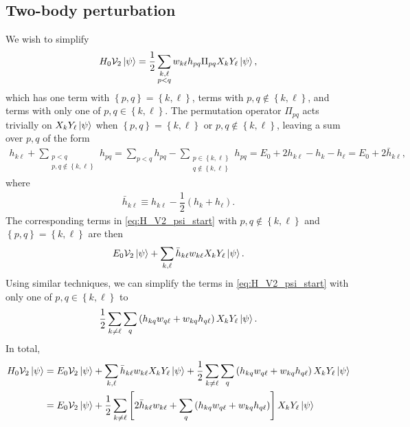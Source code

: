 \documentclass[nofootinbib,notitlepage,11pt]{revtex4-2}
\newcommand{\f}[2]{\dfrac{#1}{#2}} %
\newcommand{\p}[1]{\left(#1\right)} %
\renewcommand{\sp}[1]{\left[#1\right]} %
\renewcommand{\set}[1]{\left\{#1\right\}} %
\newcommand{\1}{\mathds{1}}
\newcommand{\V}{\mathcal{V}}
\begin{document}
\subsection{Two-body perturbation}
\label{sec:H_V2_psi}

We wish to simplify
\begin{align}
  H_0 \V_2 \ket\psi
  = \f12 \sum_{\substack{k,\ell\\p<q}} w_{k\ell} h_{pq}
  \Pi_{pq} X_k Y_\ell \ket\psi,
  \label{eq:H_V2_psi_start}
\end{align}
which has one term with $\set{p,q}=\set{k,\ell}$, terms with
$p,q\notin\set{k,\ell}$, and terms with only one of
$p,q\in\set{k,\ell}$.  The permutation operator $\Pi_{pq}$ acts
trivially on $X_k Y_\ell \ket\psi$ when $\set{p,q}=\set{k,\ell}$ or
$p,q\notin\set{k,\ell}$, leaving a sum over $p,q$ of the form
\begin{align}
  h_{k\ell} + \sum_{\substack{p<q\\p,q\notin\set{k,\ell}}} h_{pq}
  = \sum_{p<q} h_{pq}
  - \sum_{\substack{p\in\set{k,\ell}\\q\notin\set{k,\ell}}} h_{pq}
  = E_0 + 2 h_{k\ell} - h_k - h_\ell
  = E_0 + 2 \bar h_{k\ell},
\end{align}
where
\begin{align}
  \bar h_{k\ell} \equiv h_{k\ell} - \f12\p{h_k + h_\ell}.
\end{align}
The corresponding terms in \eqref{eq:H_V2_psi_start} with
$p,q\notin\set{k,\ell}$ and $\set{p,q}=\set{k,\ell}$ are then
\begin{align}
  E_0 \V_2 \ket\psi
  + \sum_{k,\ell} \bar h_{k\ell} w_{k\ell} X_k Y_\ell \ket\psi.
\end{align}
Using similar techniques, we can simplify the terms in
\eqref{eq:H_V2_psi_start} with only one of $p,q\in\set{k,\ell}$ to
\begin{align}
  \f12 \sum_{k\ne\ell} \sum_q \p{h_{kq} w_{q\ell} + w_{kq} h_{q\ell}}
  X_k Y_\ell \ket\psi.
\end{align}
In total,
\begin{align}
  H_0 \V_2 \ket\psi
  &= E_0 \V_2 \ket\psi
  + \sum_{k,\ell} \bar h_{k\ell} w_{k\ell} X_k Y_\ell \ket\psi
  + \f12 \sum_{k\ne\ell} \sum_q \p{h_{kq} w_{q\ell} + w_{kq} h_{q\ell}}
  X_k Y_\ell \ket\psi \\
  &= E_0 \V_2 \ket\psi
  + \f12 \sum_{k\ne\ell} \sp{2\bar h_{k\ell} w_{k\ell}
    + \sum_q \p{h_{kq} w_{q\ell} + w_{kq} h_{q\ell}}}
  X_k Y_\ell \ket\psi
\end{align}
\end{document}

